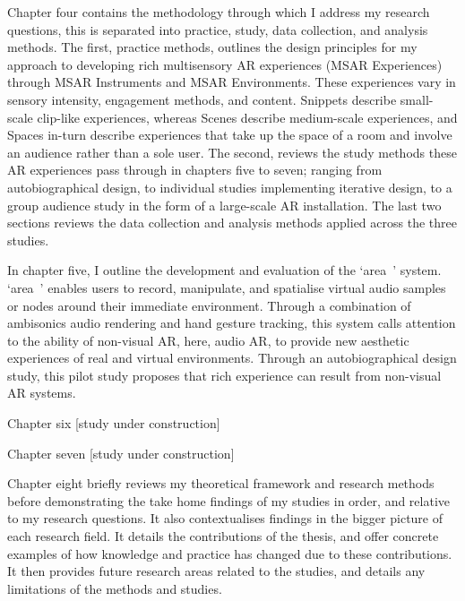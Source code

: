 Chapter four contains the methodology through which I address my research questions, this is separated into practice, study, data collection, and analysis methods. The first, practice methods, outlines the design principles for my approach to developing rich multisensory AR experiences (MSAR Experiences) through MSAR Instruments and MSAR Environments. These experiences vary in sensory intensity, engagement methods, and content. Snippets describe small-scale clip-like experiences, whereas Scenes describe medium-scale experiences, and Spaces in-turn describe experiences that take up the space of a room and involve an audience rather than a sole user. The second, reviews the study methods these AR experiences pass through in chapters five to seven; ranging from autobiographical design, to individual studies implementing iterative design, to a group audience study in the form of a large-scale AR installation. The last two sections reviews the data collection and analysis methods applied across the three studies.
 
In chapter five, I outline the development and evaluation of the ‘area~’ system. ‘area~’ enables users to record, manipulate, and spatialise virtual audio samples or nodes around their immediate environment. Through a combination of ambisonics audio rendering and hand gesture tracking, this system calls attention to the ability of non-visual AR, here, audio AR, to provide new aesthetic experiences of real and virtual environments. Through an autobiographical design study, this pilot study proposes that rich experience can result from non-visual AR systems. 

Chapter six [study under construction]

Chapter seven [study under construction]

Chapter eight briefly reviews my theoretical framework and research methods before demonstrating the take home findings of my studies in order, and relative to my research questions. It also contextualises findings in the bigger picture of each research field. It details the contributions of the thesis, and offer concrete examples of how knowledge and practice has changed due to these contributions. It then provides future research areas related to the studies, and details any limitations of the methods and studies.
